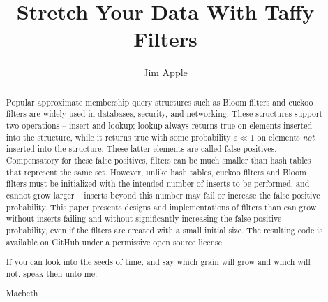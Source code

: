\documentclass[letterpaper,twocolumn,10pt]{article}
\begin{document}
\title{Stretch Your Data With Taffy Filters}
\ifanon
\else
\author{Jim Apple}
\fi






\maketitle

\begin{abstract}
Popular approximate membership query structures such as Bloom filters and cuckoo filters are widely used in databases, security, and networking.
These structures support two operations -- insert and lookup; lookup always returns true on elements inserted into the structure, while it returns true with some probability $\varepsilon \ll 1$ on elements {\em not} inserted into the structure.
These latter elements are called false positives.
Compensatory for these false positives, filters can be much smaller than hash tables that represent the same set.
However, unlike hash tables, cuckoo filters and Bloom filters must be initialized with the intended number of inserts to be performed, and cannot grow larger --
inserts beyond this number may fail or increase the false positive probability.
This paper presents designs and implementations of filters than can grow without inserts failing and without significantly increasing the false positive probability, even if the filters are created with a small initial size.
The resulting code is available on GitHub under a permissive open source license.
\ifepigraph
\epigraph{If you can look into the seeds of time, and say which grain will grow and which will not, speak then unto me.}{Macbeth}
\fi
\end{abstract}
\end{document}
